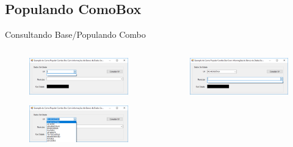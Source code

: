 	
	\subsection{Populando ComoBox}

	\begin{frame}
	
\begin{CaixaModelo01}{Consultando Base/Populando Combo}
		
	\begin{columns}
		\begin{column}{0.48\textwidth}
			\begin{figure}
				\includegraphics[scale=.25]{./Figuras/F10_ArqCSV01.png}
				\label{fig:ComboComDados01}
			\end{figure}
			\begin{figure}
				\includegraphics[scale=.25]{./Figuras/F10_ArqCSV02.png}
				\label{fig:ComboComDados02}
			\end{figure}
		\end{column}
		\begin{column}{0.48\textwidth}
			\begin{figure}
	\includegraphics[scale=.25]{./Figuras/F10_ArqCSV03.png}

\end{figure}
\end{column}
\end{columns}
\end{CaixaModelo01}
\end{frame}
